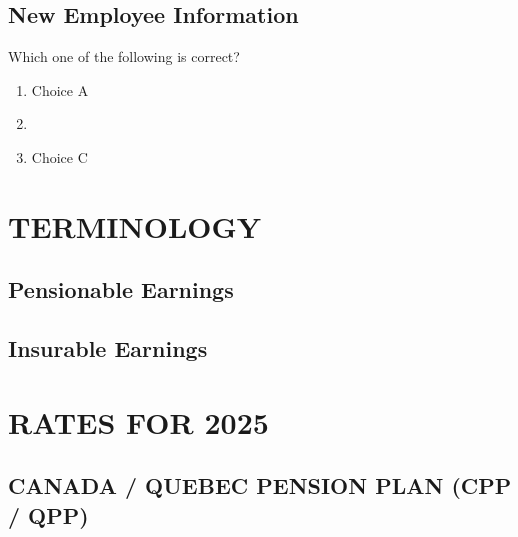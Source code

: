 \documentclass[letterpaper,10pt,english]{sphinxmanual}
\begin{document}
\section{New Employee Information}
\label{\detokenize{review_questions:new-employee-information}}
\sphinxAtStartPar
Which one of the following is correct?
\begin{enumerate}
%
\item {} 
\sphinxAtStartPar
Choice A

\item {} 
\sphinxAtStartPar
{}

\item {} 
\sphinxAtStartPar
Choice C

\end{enumerate}

\sphinxstepscope


\chapter{TERMINOLOGY}
\label{\detokenize{terminology:terminology}}\label{\detokenize{terminology::doc}}

\section{Pensionable Earnings}
\label{\detokenize{terminology:pensionable-earnings}}

\section{Insurable Earnings}
\label{\detokenize{terminology:insurable-earnings}}
\sphinxstepscope


\chapter{RATES FOR 2025}
\label{\detokenize{rates_2025:rates-for-2025}}\label{\detokenize{rates_2025::doc}}

\section{CANADA / QUEBEC PENSION PLAN (CPP / QPP)}
\label{\detokenize{rates_2025:canada-quebec-pension-plan-cpp-qpp}}
\end{document}
